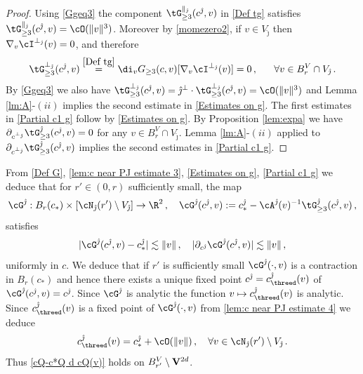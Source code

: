 \documentclass[11pt,a4paper,reqno]{article}
\numberwithin{equation}{section}
\theoremstyle{definition}
\begin{document}
    \begin{proof}
        Using \eqref{Ggeq3} 
        the  component $\tG_{\geq 3}^{\parallel_{\hat \jmath}}(c^{\hat \jmath},v) $ 
        in \eqref{Def tg} 
  satisfies  $\tG_{\geq 3}^{\parallel_{\hat \jmath}}(c^{\hat \jmath},v)=\cO(\|v\|^3)$. Moreover by \eqref{momezero2}, if $ v\in  V_{\hat \jmath} $ then 
 $ \nabla_v \cI^{\bot_{\hat \jmath}}(v) =0 $, 
 and therefore
        \begin{equation}\label{G3bot}
            \tG_{\geq 3}^{\bot_{\hat \jmath}}(c^{\hat \jmath},v) \stackrel{\eqref{Def tg} }=
            \di_v G_{\geq 3}(c,v)[
            \nabla_v \cI^{\bot_{\hat \jmath}}(v) ] = 0 \, , \quad \ \ \forall v\in B_{r}^V\cap V_{\hat \jmath}\, .
        \end{equation}
        By \eqref{Ggeq3} 
        we also have 
        $\tG^{\bot_{\hat \jmath}}_{\geq 3}(c^{\hat \jmath},v) = 
        \hat\jmath^\bot \cdot \tG^{\bot_{\hat \jmath}}_{\geq 3}(c^{\hat \jmath},v) =\cO(\|v\|^3)$ and  Lemma \ref{lm:A}-$(ii)$ implies the second estimate in \eqref{Estimates on g}.
        The first estimates in \eqref{Partial c1 g} follow by \eqref{Estimates on g}.
        By Proposition \ref{lem:expa} 
        we have
$ \partial_{c^{\bot_{\hat \jmath}}}\tG_{\geq 3}^{\hat \jmath}(c^{\hat \jmath},v)=0 $ for any 
        $ v\in B_{r}^V\cap V_{\hat \jmath} $. 
        Lemma \ref{lm:A}-$(ii)$ applied to $\partial_{c^{\bot_{\hat \jmath}}}\tG_{\geq 3}^{\hat \jmath}(c^{\hat \jmath},v)$ implies the second estimates in \eqref{Partial c1 g}.
    \end{proof}
    

    From \eqref{Def G}, \eqref{lem:c near PJ estimate 3},  \eqref{Estimates on g},
    \eqref{Partial c1 g} we deduce that for $r'\in (0,r)$ sufficiently small, the map  
    $$
        \cG^{\hat \jmath}:B_{r}(c_*)\times[ \cN_{\hat \jmath}(r') \setminus V_{\hat \jmath} ]\to \R^2 \, , \quad  \cG^{\hat \jmath}(c^{\hat \jmath},v):=c^{\hat \jmath}_*-\cA^{\hat \jmath} (v)^{-1}\tG^{\hat \jmath}_{\geq 3}(c^{\hat \jmath},v)\, , 
    $$
    satisfies
    \begin{equation}\label{lem:c near PJ estimate 4}
                |\cG^{\hat \jmath}(c^{\hat \jmath},v)-c^{\hat \jmath}_*|\lesssim \|v\|\, , \quad |\partial_{c^{\hat \jmath}}\cG^{\hat \jmath}(c^{\hat \jmath},v)|\lesssim \|v\| \, , 
    \end{equation}
    uniformly in $c$.
    We deduce that if $r'$ is sufficiently small $\cG^{\hat \jmath}(\cdot,v)$ is a contraction in $ B_r(c_*)  $ and hence there exists a unique fixed point 
    $c^{\hat \jmath}=c_{\threed}^{\hat \jmath}(v)$ of  $\cG^{\hat \jmath}(c^{\hat \jmath},v)=c^{\hat \jmath}$.
    Since $\cG^{\hat \jmath}$ is analytic the function $v\mapsto c^{\hat \jmath}_{\threed}(v)$ is analytic.
    Since $c_{\threed}^{\hat \jmath}(v)$ is a fixed point of $\cG^{\hat \jmath}(\cdot,v)$ from \eqref{lem:c near PJ estimate 4} we deduce
    \begin{equation}\label{lem:c near PJ estimate 5}
       c_{\threed}^{\hat \jmath}(v)=c^{\hat \jmath}_*+\cO(\|v\|) \, , 
       \quad \forall v\in \cN_{\hat \jmath}(r')\setminus V_{\hat \jmath}\, .
    \end{equation}   
  Thus \eqref{cQ-c*Q d cQ(v)} holds on $B_{r'}^V\setminus {\bf V}^{2d}$. 
\end{document}
